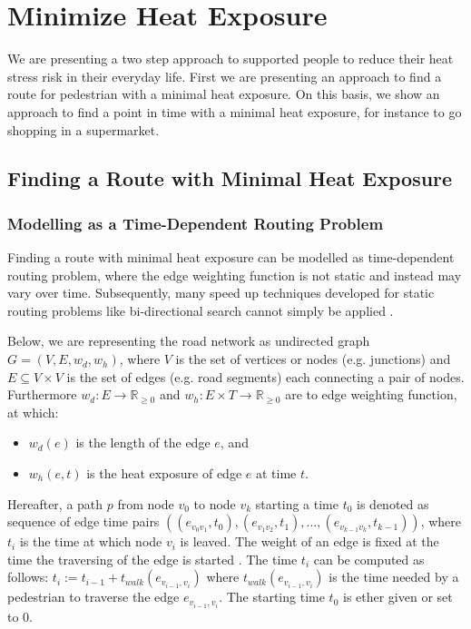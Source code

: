 
\section{Minimize Heat Exposure}

We are presenting a two step approach to supported people to reduce their heat stress risk in their everyday life. First we are presenting an approach to find a route for pedestrian with a minimal heat exposure. On this basis, we show an approach to find a point in time with a minimal heat exposure, for instance to go shopping in a supermarket.

\subsection{Finding a Route with Minimal Heat Exposure}

\subsubsection{Modelling as a Time-Dependent Routing Problem}

Finding a route with minimal heat exposure can be modelled as time-dependent routing problem, where the edge weighting function is not static and instead may vary over time. Subsequently, many speed up techniques developed for static routing problems like bi-directional search cannot simply be applied \parencite{Delling2009}. 

Below, we are representing the road network as undirected graph $G=(V,E,w_d,w_h)$, where $V$ is the set of vertices or nodes (e.g. junctions) and $E\subseteq V\times V$ is the set of edges (e.g. road segments) each connecting a pair of nodes. Furthermore $w_d: E \to \mathbb{R}_{\geq 0}$ and $w_h: E \times T \to \mathbb{R}_{\geq 0}$ are to edge weighting function, at which:
\begin{itemize}
	\item $w_d(e)$ is the length of the edge $e$, and
	\item $w_h(e, t)$ is the heat exposure of edge $e$ at time $t$.
\end{itemize}   
Hereafter, a path $p$ from node $v_0$ to node $v_k$ starting a time $t_0$ is denoted as sequence of edge time pairs $((e_{v_0v_1},t_0),(e_{v_1v_2},t_1),\dots, (e_{v_{k-1}v_k},t_{k-1}))$, where $t_i$ is the time at which node $v_i$ is leaved. The weight of an edge is fixed at the time the traversing of the edge is started \parencite[the so-called frozen link model,][]{Orda1990}. The time $t_i$ can be computed as follows: $t_i := t_{i-1} + t_{walk}(e_{v_{i-1},v_i})$ where $t_{walk}(e_{v_{i-1},v_i})$ is the time needed by a pedestrian to traverse the edge $e_{v_{i-1},v_i}$. The starting time $t_0$ is ether given or set to $0$. 

